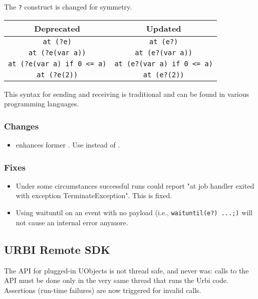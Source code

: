 The \lstinline|?| construct is changed for symmetry.

\begin{center}
  \begin{tabular}{|c|c|}
    \hline
    Deprecated & Updated \\
    \hline
   \lstinline|at (?e)|                  & \lstinline|at (e?)|\\
   \lstinline|at (?e(var a))|           & \lstinline|at (e?(var a))|\\
   \lstinline|at (?e(var a) if 0 <= a)| & \lstinline|at (e?(var a) if 0 <= a)|\\
   \lstinline|at (?e(2))|               & \lstinline|at (e?(2))|\\
 \end{tabular}
\end{center}

This syntax for sending and receiving is traditional and can be found
in various programming languages.

\subsubsection{Changes}

\begin{itemize}
\item {} enhances former .
  Use  instead of .
\end{itemize}

\subsubsection{Fixes}
\begin{itemize}
\item Under some circumstances successful runs could report "at job
  handler exited with exception TerminateException".  This is fixed.

\item Using waituntil on an event with no payload (i.e.,
  \lstinline|waituntil(e?) ...;)| will not cause an internal error
  anymore.
\end{itemize}

\subsection{URBI Remote SDK}

The API for plugged-in UObjects is not thread safe, and never was:
calls to the API must be done only in the very same thread that runs
the Urbi code.  Assertions (run-time failures) are now triggered for
invalid calls.

